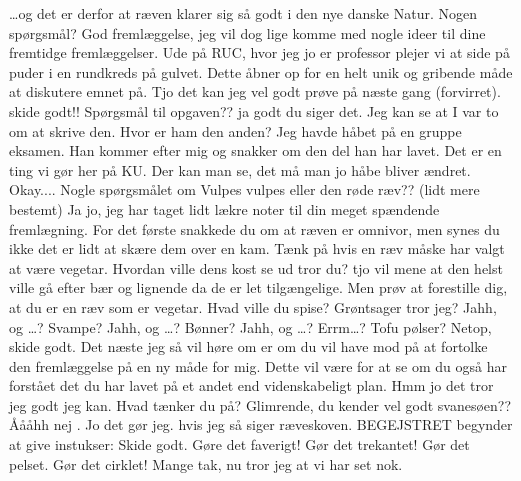 \documentclass[a4paper,11pt]{article}
\begin{document}
\begin{sketch}
 \ldots og det er derfor at ræven klarer sig så godt i den nye danske Natur. Nogen spørgsmål?
 God fremlæggelse, jeg vil dog lige komme med nogle ideer til dine fremtidge fremlæggelser. Ude på RUC, hvor jeg jo er professor plejer vi at side på puder i en rundkreds på gulvet. Dette åbner op for en helt unik og gribende måde at diskutere emnet på.
 Tjo det kan jeg vel godt prøve på næste gang (forvirret).
 skide godt!!
 Spørgsmål til opgaven??
 ja godt du siger det. Jeg kan se at I var to om at skrive den. Hvor er ham den anden? Jeg havde håbet på en gruppe eksamen.
 Han kommer efter mig og snakker om den del han har lavet. Det er en ting vi gør her på KU.
 Der kan man se, det må man jo håbe bliver ændret.
 Okay.... Nogle spørgsmålet om Vulpes vulpes eller den røde ræv?? (lidt mere bestemt) 
 Ja jo, jeg har taget lidt lækre noter til din meget spændende fremlægning. For det første snakkede du om at ræven er omnivor, men synes du ikke det er lidt at skære dem over en kam. Tænk på hvis en ræv måske har valgt at være vegetar. Hvordan ville dens kost se ud tror du?
 tjo vil mene at den helst ville gå efter bær og lignende da de er let tilgængelige.
 Men prøv at forestille dig, at du er en ræv som er vegetar. Hvad ville du spise?
 Grøntsager tror jeg?
 Jahh, og \ldots ?
 Svampe?
 Jahh, og \ldots ?
 Bønner?
 Jahh, og \ldots ?
 Errm\ldots ? Tofu pølser?
 Netop, skide godt.
 Det næste jeg så vil høre om er om du vil have mod på at fortolke den fremlæggelse på en ny måde for mig. Dette vil være for at se om du også har forstået det du har lavet på et andet end videnskabeligt plan.
 Hmm jo det tror jeg godt jeg kan. Hvad tænker du på?
 Glimrende, du kender vel godt svanesøen??
 Åååhh nej . Jo det gør jeg.
 hvis jeg så siger ræveskoven.
 BEGEJSTRET begynder at give instukser: Skide godt. Gøre det
faverigt! Gør det trekantet! Gør det pelset. Gør det cirklet!
 Mange tak, nu tror jeg at vi har set nok.


\end{sketch}
\end{document}
